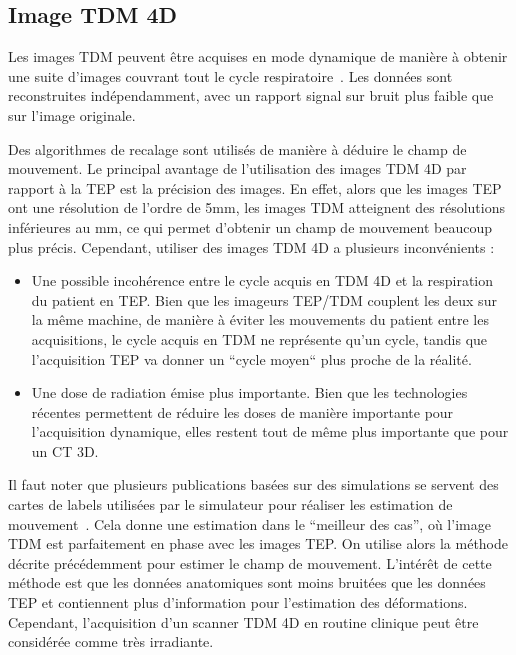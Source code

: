 \subsection{Image TDM 4D}

Les images TDM peuvent être acquises en mode dynamique de manière à obtenir une suite d'images couvrant tout le cycle respiratoire~\cite{lamare2007list, qiao2006motion}. Les données sont reconstruites indépendamment, avec un rapport signal sur bruit plus faible que sur l'image originale. 

Des algorithmes de recalage sont utilisés de manière à déduire le champ de mouvement. Le principal avantage de l'utilisation des images TDM 4D par rapport à la TEP est la précision des images. En effet, alors que les images TEP ont une résolution de l'ordre de 5mm, les images TDM atteignent des résolutions inférieures au mm, ce qui permet d'obtenir un champ de mouvement beaucoup plus précis. Cependant, utiliser des images TDM 4D a plusieurs inconvénients :

\begin{itemize}
 \item Une possible incohérence entre le cycle acquis en TDM 4D et la respiration du patient en TEP. Bien que les imageurs TEP/TDM couplent les deux sur la même machine, de manière à éviter les mouvements du patient entre les acquisitions, le cycle acquis en TDM ne représente qu'un cycle, tandis que l'acquisition TEP va donner un ``cycle moyen`` plus proche de la réalité.
 \item Une dose de radiation émise plus importante. Bien que les technologies récentes permettent de réduire les doses de manière importante pour l'acquisition dynamique, elles restent tout de même plus importante que pour un CT 3D.
\end{itemize}

Il faut noter que plusieurs publications basées sur des simulations se servent des cartes de labels utilisées par le simulateur pour réaliser les estimation de mouvement~\cite{lamare2007list}. Cela donne une estimation dans le ``meilleur des cas'', où l'image TDM est parfaitement en phase avec les images TEP. On utilise alors la méthode décrite précédemment pour estimer le champ de mouvement. L'intérêt de cette méthode est que les données anatomiques sont moins bruitées que les données TEP et contiennent plus d'information pour l'estimation des déformations. Cependant, l'acquisition d'un scanner TDM 4D en routine clinique peut être considérée comme très irradiante.

